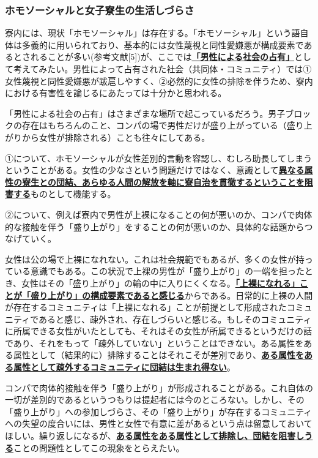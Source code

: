 \subsubsection{\large ホモソーシャルと女子寮生の生活しづらさ}
寮内には、現状「ホモソーシャル」は存在する。「ホモソーシャル」という語自体は多義的に用いられており、基本的には女性蔑視と同性愛嫌悪が構成要素であるとされることが多い(参考文献[5])が、ここでは\uline{\bf{「男性による社会の占有」}}として考えてみたい。男性によって占有された社会（共同体・コミュニティ）では①女性蔑視と同性愛嫌悪が跋扈しやすく、②必然的に女性の排除を伴うため、寮内における有害性を論じるにあたっては十分かと思われる。
\par 「男性による社会の占有」はさまざまな場所で起こっているだろう。男子ブロックの存在はもちろんのこと、コンパの場で男性だけが盛り上がっている（盛り上がりから女性が排除される）ことも往々にしてある。
\par ①について、ホモソーシャルが女性差別的言動を容認し、むしろ助長してしまうということがある。女性の少なさという問題だけではなく、意識として\uline{\bf{異なる属性の寮生との団結、あらゆる人間の解放を軸に寮自治を貫徹するということを阻害する}}ものとして機能する。
\par ②について、例えば寮内で男性が上裸になることの何が悪いのか、コンパで肉体的な接触を伴う「盛り上がり」をすることの何が悪いのか、具体的な話題からつなげていく。
\par 女性は公の場で上裸になれない。これは社会規範でもあるが、多くの女性が持っている意識でもある。この状況で上裸の男性が「盛り上がり」の一端を担ったとき、女性はその「盛り上がり」の輪の中に入りにくくなる。\uline{\bf{「上裸になれる」ことが「盛り上がり」の構成要素であると感じる}}からである。日常的に上裸の人間が存在するコミュニティは「上裸になれる」ことが前提として形成されたコミュニティであると感じ、疎外され、存在しづらいと感じる。もしそのコミュニティに所属できる女性がいたとしても、それはその女性が所属できるというだけの話であり、それをもって「疎外していない」ということはできない。ある属性をある属性として（結果的に）排除することはそれこそが差別であり、\uline{\bf{ある属性をある属性として疎外するコミュニティに団結は生まれ得ない}}。
\par コンパで肉体的接触を伴う「盛り上がり」が形成されることがある。これ自体の一切が差別的であるというつもりは提起者には今のところない。しかし、その「盛り上がり」への参加しづらさ、その「盛り上がり」が存在するコミュニティへの失望の度合いには、男性と女性で有意に差があるという点は留意しておいてほしい。繰り返しになるが、\uline{\bf{ある属性をある属性として排除し、団結を阻害しうる}}ことの問題性としてこの現象をとらえたい。


